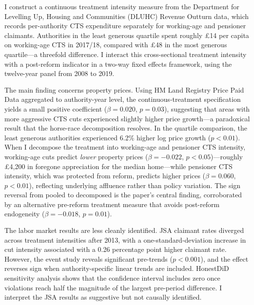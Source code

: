 \documentclass[12pt]{article}
\begin{document}
I construct a continuous treatment intensity measure from the Department for Levelling Up, Housing and Communities (DLUHC) Revenue Outturn data, which records per-authority CTS expenditure separately for working-age and pensioner claimants. Authorities in the least generous quartile spent roughly \pounds14 per capita on working-age CTS in 2017/18, compared with \pounds48 in the most generous quartile---a threefold difference. I interact this cross-sectional treatment intensity with a post-reform indicator in a two-way fixed effects framework, using the twelve-year panel from 2008 to 2019.

The main finding concerns property prices. Using HM Land Registry Price Paid Data aggregated to authority-year level, the continuous-treatment specification yields a small positive coefficient ($\beta = 0.020$, $p = 0.03$), suggesting that areas with more aggressive CTS cuts experienced slightly higher price growth---a paradoxical result that the horse-race decomposition resolves. In the quartile comparison, the least generous authorities experienced 6.2\% higher log price growth ($p < 0.01$). When I decompose the treatment into working-age and pensioner CTS intensity, working-age cuts predict \textit{lower} property prices ($\beta = -0.022$, $p < 0.05$)---roughly \pounds4,200 in foregone appreciation for the median home---while pensioner CTS intensity, which was protected from reform, predicts higher prices ($\beta = 0.060$, $p < 0.01$), reflecting underlying affluence rather than policy variation. The sign reversal from pooled to decomposed is the paper's central finding, corroborated by an alternative pre-reform treatment measure that avoids post-reform endogeneity ($\beta = -0.018$, $p = 0.01$).

The labor market results are less cleanly identified. JSA claimant rates diverged across treatment intensities after 2013, with a one-standard-deviation increase in cut intensity associated with a 0.26 percentage point higher claimant rate. However, the event study reveals significant pre-trends ($p < 0.001$), and the effect reverses sign when authority-specific linear trends are included. HonestDiD sensitivity analysis \citep{rambachan2023} shows that the confidence interval includes zero once violations reach half the magnitude of the largest pre-period difference. I interpret the JSA results as suggestive but not causally identified.
\end{document}
